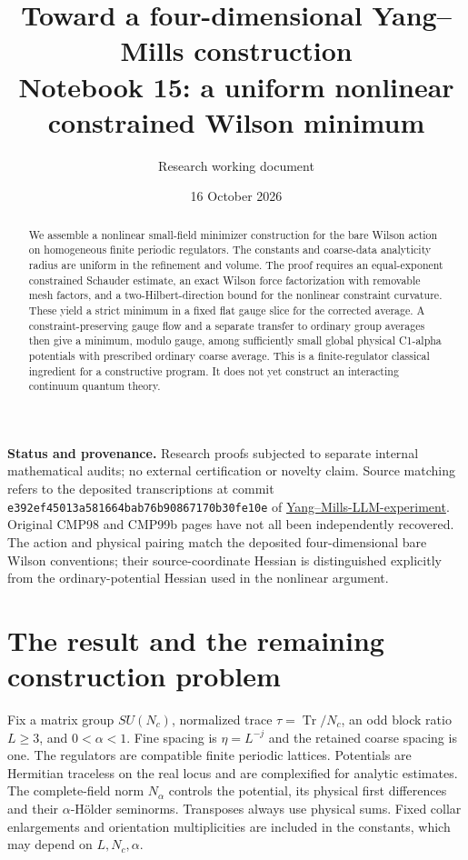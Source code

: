\documentclass[11pt]{article}
\title{Toward a four-dimensional Yang--Mills construction\\
\large Notebook 15: a uniform nonlinear constrained Wilson minimum}
\author{Research working document}
\date{16 October 2026}
\theoremstyle{remark}
\begin{document}
\maketitle
\begin{abstract}
We assemble a nonlinear small-field minimizer construction for the
bare Wilson action on homogeneous finite periodic regulators.
The constants and coarse-data analyticity radius are uniform in
the refinement and volume. The proof requires an equal-exponent
constrained Schauder estimate, an exact Wilson force factorization
with removable mesh factors, and a two-Hilbert-direction bound
for the nonlinear constraint curvature. These yield a strict
minimum in a fixed flat gauge slice for the corrected average.
A constraint-preserving gauge flow and a separate transfer to
ordinary group averages then give a minimum, modulo gauge,
among sufficiently small global physical C1-alpha potentials
with prescribed ordinary coarse average. This is a finite-regulator
classical ingredient for a constructive program. It does not yet
construct an interacting continuum quantum theory.
\end{abstract}

\noindent\textbf{Status and provenance.}
Research proofs subjected to separate internal mathematical audits;
no external certification or novelty claim. Source matching refers
to the deposited transcriptions at commit
\texttt{e392ef45013a581664bab76b90867170b30fe10e} of
\href{https://github.com/ethanwsussman/Yang--Mills-LLM-experiment/tree/e392ef45013a581664bab76b90867170b30fe10e}{Yang--Mills-LLM-experiment}.
Original CMP98 and CMP99b pages have not all been independently
recovered. The action and physical pairing match the deposited
four-dimensional bare Wilson conventions; their source-coordinate
Hessian is distinguished explicitly from the ordinary-potential
Hessian used in the nonlinear argument.

\section{The result and the remaining construction problem}
\label{nm15-overview}

Fix a matrix group $SU(N_c)$, normalized trace
$\tau=\operatorname{Tr}/N_c$, an odd block ratio $L\ge3$,
and $0<\alpha<1$. Fine spacing is $\eta=L^{-j}$ and the
retained coarse spacing is one. The regulators are compatible
finite periodic lattices. Potentials are Hermitian traceless
on the real locus and are complexified for analytic estimates.
The complete-field norm $N_\alpha$ controls the potential,
its physical first differences and their $\alpha$-H\"older
seminorms. Transposes always use physical sums. Fixed collar
enlargements and orientation multiplicities are included in
the constants, which may depend on $L,N_c,\alpha$.
\end{document}
